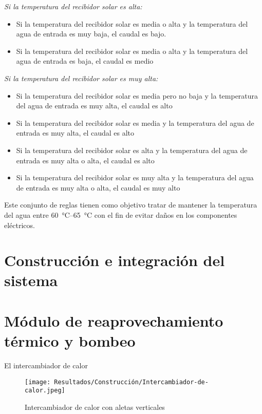 			\textit{Si la temperatura del recibidor solar es alta:}\par
			\begin{itemize}
				\item Si la temperatura del recibidor solar es media o alta y la temperatura del agua de entrada es muy baja, el caudal es bajo.
				\item Si la temperatura del recibidor solar es media o alta y la temperatura del agua de entrada es baja, el caudal es medio
			\end{itemize}
			
			\textit{Si la temperatura del recibidor solar es muy alta:}\par
			\begin{itemize}
				\item Si la temperatura del recibidor solar es media pero no baja y la temperatura del agua de entrada es muy alta, el caudal es alto
				\item Si la temperatura del recibidor solar es media y la temperatura del agua de entrada es muy alta, el caudal es alto
				\item Si la temperatura del recibidor solar es alta y la temperatura del agua de entrada es muy alta o alta, el caudal es alto
				\item Si la temperatura del recibidor solar es muy alta y la temperatura del agua de entrada es muy alta o alta, el caudal es muy alto
			\end{itemize}
			
			Este conjunto de reglas tienen como objetivo tratar de mantener la temperatura del agua entre \qtyrange{60}{65}{\degreeCelsius} con el fin de evitar daños en los componentes eléctricos.
	
	
	\section{Construcción e integración del sistema}
		
		\section{Módulo de reaprovechamiento térmico y bombeo}
		
			El intercambiador de calor 
			
			\begin{figure}[H]
				\centering
				\texttt{[image: Resultados/Construcción/Intercambiador-de-calor.jpeg]}
				\caption{Intercambiador de calor con aletas verticales}
				\label{fig:Intercambiador-de-calor.jpeg}
			\end{figure}
		
